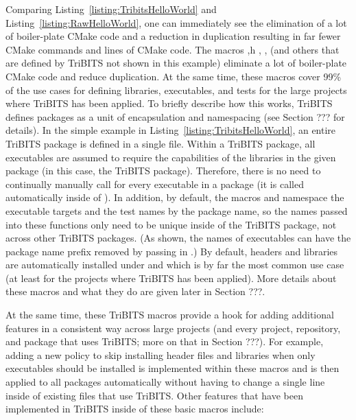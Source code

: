 \documentclass[note]{TechNote}
\begin{document}
Comparing Listing~\ref{listing:TribitsHelloWorld} and Listing~\ref{listing:RawHelloWorld}, one can immediately see the elimination of a lot of boiler-plate CMake code and a reduction in duplication resulting in far fewer CMake commands and lines of CMake code.  The macros ,h , ,  (and others that are defined by TriBITS not shown in this example) eliminate a lot of boiler-plate CMake code and reduce duplication.  At the same time, these macros cover 99\% of the use cases for defining libraries, executables, and tests for the large projects where TriBITS has been applied.  To briefly describe how this works, TriBITS defines packages as a unit of encapsulation and namespacing (see Section ??? for details).  In the simple example in Listing~\ref{listing:TribitsHelloWorld}, an entire TriBITS package is defined in a single  file.  Within a TriBITS package, all executables are assumed to require the capabilities of the libraries in the given package (in this case, the  TriBITS package).  Therefore, there is no need to continually manually call  for every executable in a package (it is called automatically inside of ).  In addition, by default, the macros  and  namespace the executable targets and the test names by the package name, so the names passed into these functions only need to be unique inside of the TriBITS package, not across other TriBITS packages.  (As shown, the names of executables can have the package name prefix removed by passing in .)  By default, headers and libraries are automatically installed under  and  which is by far the most common use case (at least for the projects where TriBITS has been applied).  More details about these macros and what they do are given later in Section ???.

At the same time, these TriBITS macros provide a hook for adding additional features in a consistent way across large projects (and every project, repository, and package that uses TriBITS; more on that in Section ???).  For example, adding a new policy to skip installing header files and libraries when only executables should be installed is implemented within these macros and is then applied to all packages automatically without having to change a single line inside of existing  files that use TriBITS.  Other features that have been implemented in TriBITS inside of these basic macros include:
\end{document}
